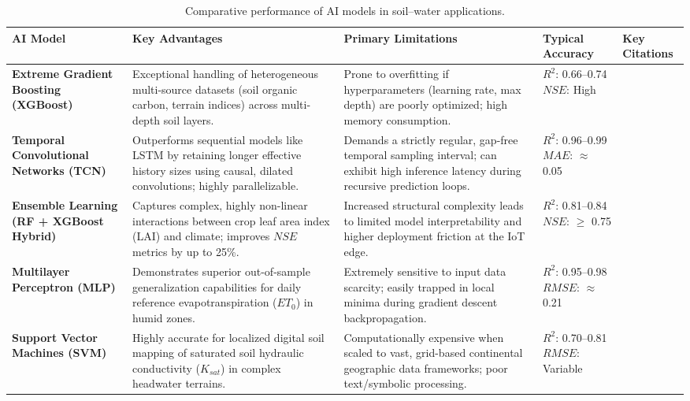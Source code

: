 \documentclass[land,article,submit,pdftex,moreauthors]{Definitions/mdpi}
\numberwithin{equation}{section}
\begin{document}
\begin{longtable}{@{\extracolsep{\fill}} p{} p{} p{} p{} p{} @{}}
\caption{Comparative performance of AI models in soil--water applications. \label{tab:performance}}\\
\toprule
\textbf{AI Model} & \textbf{Key Advantages} & \textbf{Primary Limitations} & \textbf{Typical Accuracy} & \textbf{Key Citations} \\
\midrule
\endhead 

\bottomrule
\endfoot 

\textbf{Extreme Gradient Boosting (XGBoost)} & 
Exceptional handling of heterogeneous multi-source datasets (soil organic carbon, terrain indices) across multi-depth soil layers. & 
Prone to overfitting if hyperparameters (learning rate, max depth) are poorly optimized; high memory consumption. & 
$R^2$: 0.66--0.74\newline $NSE$: High & 
\citep{Demir2026} \\ \hline

\textbf{Temporal Convolutional Networks (TCN)} & 
Outperforms sequential models like LSTM by retaining longer effective history sizes using causal, dilated convolutions; highly parallelizable. & 
Demands a strictly regular, gap-free temporal sampling interval; can exhibit high inference latency during recursive prediction loops. & 
$R^2$: 0.96--0.99\newline $MAE$: $\approx$ 0.05 & 
\citep{ScientificReports2025} \\ \hline

\textbf{Ensemble Learning (RF + XGBoost Hybrid)} & 
Captures complex, highly non-linear interactions between crop leaf area index (LAI) and climate; improves $NSE$ metrics by up to 25\%. & 
Increased structural complexity leads to limited model interpretability and higher deployment friction at the IoT edge. & 
$R^2$: 0.81--0.84\newline $NSE$: $\ge$ 0.75 & 
\\ \hline

\textbf{Multilayer Perceptron (MLP)} & 
Demonstrates superior out-of-sample generalization capabilities for daily reference evapotranspiration ($ET_0$) in humid zones. & 
Extremely sensitive to input data scarcity; easily trapped in local minima during gradient descent backpropagation. & 
$R^2$: 0.95--0.98\newline $RMSE$: $\approx$ 0.21 & 
\citep{Acharki2025, Veredas2026} \\ \hline

\textbf{Support Vector Machines (SVM)} & 
Highly accurate for localized digital soil mapping of saturated soil hydraulic conductivity ($K_{sat}$) in complex headwater terrains. & 
Computationally expensive when scaled to vast, grid-based continental geographic data frameworks; poor text/symbolic processing. & 
$R^2$: 0.70--0.81\newline $RMSE$: Variable & 
\citep{MDPIReview2025} \\

\end{longtable}
\normalsize
\end{document}
